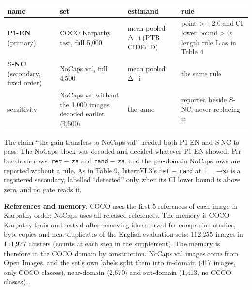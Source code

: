 \begin{longtable}[]{@{}
  >{\raggedright\arraybackslash}p{}
  >{\raggedright\arraybackslash}p{}
  >{\raggedright\arraybackslash}p{}
  >{\raggedright\arraybackslash}p{}@{}}
\toprule\noalign{}
\begin{minipage}[b]{\linewidth}\raggedright
name
\end{minipage} & \begin{minipage}[b]{\linewidth}\raggedright
set
\end{minipage} & \begin{minipage}[b]{\linewidth}\raggedright
estimand
\end{minipage} & \begin{minipage}[b]{\linewidth}\raggedright
rule
\end{minipage} \\
\midrule\noalign{}
\endhead
\bottomrule\noalign{}
\endlastfoot
\textbf{P1-EN} (primary) & COCO Karpathy test, full 5,000 \citep{Lin2014COCO, Karpathy2015Split} &
mean pooled Δ\_i (PTB CIDEr-D) & point \textgreater{} +2.0 and CI lower bound \textgreater{} 0;
length rule L as in Table 4 \\
\textbf{S-NC} (secondary, fixed order) & NoCaps val, full 4,500 \citep{Agrawal2019NoCaps} & mean
pooled Δ\_i & the same rule \\
sensitivity & NoCaps val without the 1,000 images decoded earlier (3,500) & the same & reported
beside S-NC, never replacing it \\
\end{longtable}

The claim ``the gain transfers to NoCaps val'' needed both P1-EN and S-NC to pass. The NoCaps block
was decoded and decided whatever P1-EN showed. Per-backbone rows, \texttt{ret} − \texttt{zs} and
\texttt{rand} − \texttt{zs}, and the per-domain NoCaps rows are reported without a rule. As in Table
9, InternVL3's \texttt{ret} − \texttt{rand} at τ = −∞ is a registered secondary, labelled
``detected'' only when its CI lower bound is above zero, and no gate reads it.

\textbf{References and memory.} COCO uses the first 5 references of each image in Karpathy order;
NoCaps uses all released references. The memory is COCO Karpathy train and restval after removing
ids reserved for companion studies, byte copies and near-duplicates of the English evaluation sets:
112,255 images in 111,927 clusters (counts at each step in the supplement). The memory is therefore
in the COCO domain by construction. NoCaps val images come from Open Images, and the set's own
labels split them into in-domain (417 images, only COCO classes), near-domain (2,670) and out-domain
(1,413, no COCO classes) \citep{Agrawal2019NoCaps}.

